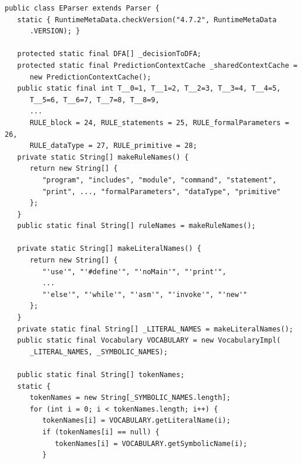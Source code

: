 \begin{lstlisting}[frame=htrbl, caption={Generation of {\ttfamily EParser.java}}, label={lst:parser}, basicstyle=\footnotesize]
public class EParser extends Parser {
   static { RuntimeMetaData.checkVersion("4.7.2", RuntimeMetaData
      .VERSION); }

   protected static final DFA[] _decisionToDFA;
   protected static final PredictionContextCache _sharedContextCache =
      new PredictionContextCache();
   public static final int T__0=1, T__1=2, T__2=3, T__3=4, T__4=5, 
      T__5=6, T__6=7, T__7=8, T__8=9, 
      ...
      RULE_block = 24, RULE_statements = 25, RULE_formalParameters = 26, 
      RULE_dataType = 27, RULE_primitive = 28;
   private static String[] makeRuleNames() {
      return new String[] {
         "program", "includes", "module", "command", "statement", 
         "print", ..., "formalParameters", "dataType", "primitive"
      };
   }
   public static final String[] ruleNames = makeRuleNames();
   
   private static String[] makeLiteralNames() {
      return new String[] {
         "'use'", "'#define'", "'noMain'", "'print'", 
         ...
         "'else'", "'while'", "'asm'", "'invoke'", "'new'"
      };
   }
   private static final String[] _LITERAL_NAMES = makeLiteralNames();
   public static final Vocabulary VOCABULARY = new VocabularyImpl(
      _LITERAL_NAMES, _SYMBOLIC_NAMES);
   
   public static final String[] tokenNames;
   static {
      tokenNames = new String[_SYMBOLIC_NAMES.length];
      for (int i = 0; i < tokenNames.length; i++) {
         tokenNames[i] = VOCABULARY.getLiteralName(i);
         if (tokenNames[i] == null) {
            tokenNames[i] = VOCABULARY.getSymbolicName(i);
         }
   

\end{lstlisting}
